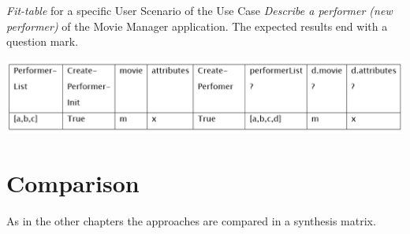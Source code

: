 \begin{table}[h!]
	\caption{\textit{Fit-table} for a specific User Scenario of the Use Case \textit{Describe a performer (new performer)} of the Movie Manager application. The expected results end with a question mark.}
	\centering
	\includegraphics[width=\textwidth]{../images/LongoFit.png}

	
	\label{fig:fit-longo}
\end{table}

\newpage
\section{Comparison}
\label{sec:comparison}

As in the other chapters the approaches are compared in a synthesis matrix.

\renewcommand{\arraystretch}{1.5}
 
